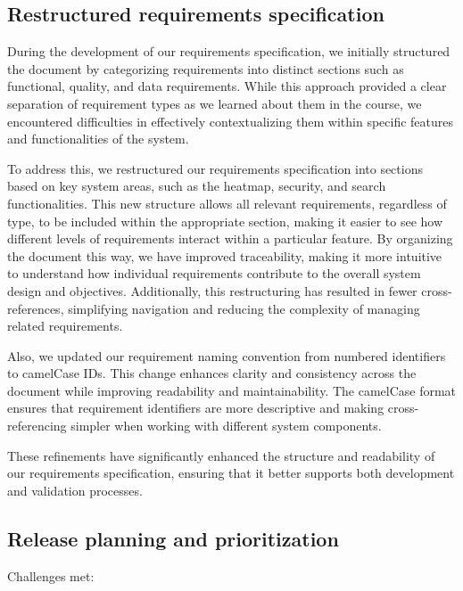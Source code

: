 \subsection{Restructured requirements specification}
During the development of our requirements specification, we initially structured the document by categorizing requirements into distinct sections such as functional, quality, and data requirements. While this approach provided a clear separation of requirement types as we learned about them in the course, we encountered difficulties in effectively contextualizing them within specific features and functionalities of the system.

To address this, we restructured our requirements specification into sections based on key system areas, such as the heatmap, security, and search functionalities. This new structure allows all relevant requirements, regardless of type, to be included within the appropriate section, making it easier to see how different levels of requirements interact within a particular feature. By organizing the document this way, we have improved traceability, making it more intuitive to understand how individual requirements contribute to the overall system design and objectives. Additionally, this restructuring has resulted in fewer cross-references, simplifying navigation and reducing the complexity of managing related requirements.

Also, we updated our requirement naming convention from numbered identifiers to camelCase IDs. This change enhances clarity and consistency across the document while improving readability and maintainability. The camelCase format ensures that requirement identifiers are more descriptive and making cross-referencing simpler when working with different system components.

These refinements have significantly enhanced the structure and readability of our requirements specification, ensuring that it better supports both development and validation processes.

\subsection{Release planning and prioritization}
Challenges met:

